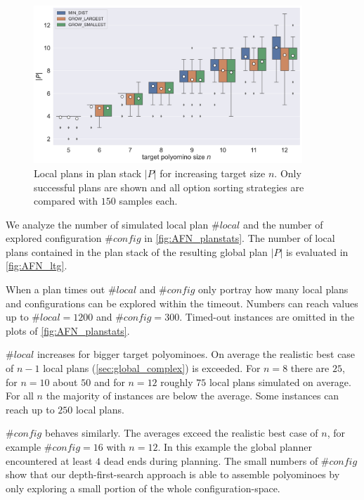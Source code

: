 \begin{figure}
	\centering
	\includegraphics[width=0.9\textwidth]{figures/plots/AFN_ltg.pdf}
	\caption[Local plans in plan stack for increasing target size]{Local plans in plan stack $|P|$ for increasing target size $n$. Only successful plans are shown and all option sorting strategies are compared with $150$ samples each.}
	\label{fig:AFN_ltg}
\end{figure}


We analyze the number of simulated local plan $\#\textit{local}$ and the number of explored configuration $\#\textit{config}$ in \autoref{fig:AFN_planstats}.
The number of local plans contained in the plan stack of the resulting global plan $|P|$ is evaluated in \autoref{fig:AFN_ltg}.

When a plan times out $\#\textit{local}$ and $\#\textit{config}$ only portray how many local plans and configurations can be explored within the timeout.
Numbers can reach values up to $\#\textit{local} = 1200$ and $\#\textit{config} = 300$.
Timed-out instances are omitted in the plots of \autoref{fig:AFN_planstats}.

$\#\textit{local}$ increases for bigger target polyominoes.
On average the realistic best case of $n-1$ local plans (\autoref{sec:global_complex}) is exceeded.
For $n=8$ there are $25$, for $n=10$ about $50$ and for $n=12$ roughly $75$ local plans simulated on average.
For all $n$ the majority of instances are below the average.
Some instances can reach up to $250$ local plans.

$\#\textit{config}$ behaves similarly.
The averages exceed the realistic best case of $n$, for example $\#\textit{config} = 16$ with $n=12$.
In this example the global planner encountered at least $4$ dead ends during planning.
The small numbers of $\#\textit{config}$ show that our depth-first-search approach is able to assemble polyominoes by only exploring a small portion of the whole configuration-space.

